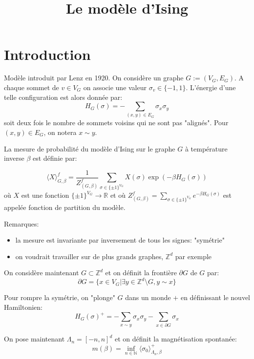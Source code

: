 \documentclass[a4paper,12pt]{report}
\title{ \begin{Huge} Le modèle d'Ising \end{Huge} }
\begin{document}
\maketitle

\newpage

\tableofcontents

\newpage

\section{Introduction}
Modèle introduit par Lenz en 1920. On considère un graphe $G := (V_G, E_G)$. A chaque sommet de $v \in V_G$ on associe une valeur $\sigma_v \in \{-1, 1\}$. L'énergie d'une telle configuration est alors donnée par:
$$
H_G(\sigma) = - \sum_{(x,y) \in E_G} \sigma_x \sigma_y
$$
soit deux fois le nombre de sommets voisins qui ne sont pas "alignés". Pour $(x,y) \in E_G$, on notera $x \sim y$.

\begin{defi}
La mesure de probabilité du modèle d'Ising sur le graphe $G$ à température inverse $\beta$ est définie par:

	$$
\langle X \rangle_{G, \beta}^{f} = \frac{1}{Z^f_{(G,\beta)}} \sum_{\sigma \in \{\pm 1\}^{V_G}} X(\sigma) \exp(-\beta H_G(\sigma))
	$$
	où $X$ est une fonction $\{\pm 1\}^{V_G} \rightarrow \mathbb{R}$ et où $Z^f_{(G,\beta)}=\sum_{\sigma \in \{\pm 1\}^{V_G}} e^{-\beta H_G(\sigma)}$ est appelée fonction de partition du modèle.
	\end{defi}

Remarques:
\begin{itemize}
\item la mesure est invariante par inversement de tous les signes: "symétrie"
\item on voudrait travailler sur de plus grands graphes, $\mathbb{Z}^d$ par exemple
\end{itemize}

On considère maintenant $G \subset \mathbb{Z}^d$ et on définit la frontière $\partial G$ de $G$ par:
$$
\partial G = \lbrace x \in V_G \vert \exists y \in \mathbb{Z}^d \setminus G, y \sim x \rbrace
$$

Pour rompre la symétrie, on "plonge" $G$ dans un monde $+$ en définissant le nouvel Hamiltonien:
$$
H_G(\sigma)^+ = - \sum_{x \sim y} \sigma_x \sigma_y  -  \sum_{x \in \partial G} \sigma_x
$$

On pose maintenant $\Lambda_n = [-n,n]^d$ et on définit la magnétisation spontanée:
$$
m(\beta) = \inf_{n \in \mathbb{N}} \langle \sigma_0 \rangle^+_{\Lambda_n, \beta}
$$
\end{document}

